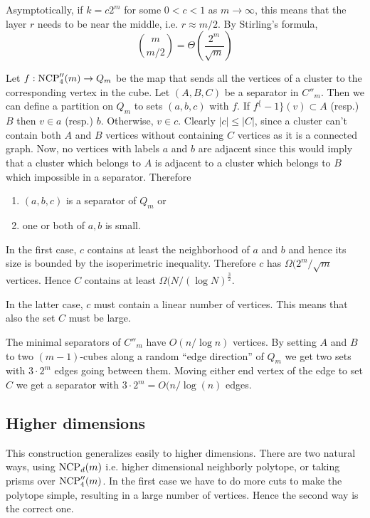 Asymptotically, if $k = c2^m$ for some $0<c<1$ as $m\rightarrow \infty$, this 
means that the layer $r$ needs to be near the middle, i.e. $r\approx m/2$. 
By Stirling's formula,
\begin{equation}
 {m \choose m/2} = \Theta \left(\frac{2^m}{\sqrt{m}}\right)
\end{equation}

Let $f: \textrm{NCP}''_4(m) \rightarrow Q_m$ 
be the map that sends all the vertices of a cluster to the corresponding vertex 
in the cube. 
Let $(A,B,C)$ be a separator in $C''_m$. Then we can define a partition on 
$Q_m$ to sets $(a,b,c)$ with $f$. If $f^\{-1\}(v) \subset A$ (resp.) $B$ then 
$v \in a$ (resp.) $b$. Otherwise, $v \in c$. Clearly $|c| \leq |C|$, since a 
cluster can't contain both $A$ and $B$ vertices without containing $C$ vertices 
as it is a connected graph.
Now, no vertices with labels $a$ and $b$ are adjacent since this would imply 
that a cluster which belongs to $A$ is adjacent to a cluster which belongs to 
$B$ which impossible in a separator. Therefore
\begin{enumerate}
 \item $(a,b,c)$ is a separator of $Q_m$ or
\item one or both of $a,b$ is small.
\end{enumerate}
In the first case, $c$ contains at least the neighborhood of $a$ and $b$ and 
hence its size is bounded by the isoperimetric inequality. Therefore $c$ has 
$\Omega(2^m/\sqrt{m}$ vertices. Hence $C$ contains at least $\Omega(N/(\log 
N)^{\frac{3}{2}}$.

In the latter case, $c$ must contain a linear number of vertices. This means 
that also the set $C$ must be large.  

The minimal separators of $C''_m$ have $O(n/\log n)$ vertices. By setting $A$ 
and $B$ to two $(m-1)$-cubes along a random ``edge direction'' of $Q_m$ we get 
two sets with $3\cdot 2^m$ edges going between them. Moving either end vertex 
of the edge to set $C$ we get a separator with $3\cdot 2^m = O(n/\log(n)$ 
edges.

\subsection{Higher dimensions}

This construction generalizes easily to higher dimensions. There are two 
natural ways, using $\textrm{NCP}_d(m)$ i.e. higher dimensional neighborly polytope, or 
taking prisms over $\textrm{NCP}''_4(m)$.  In the first case we have to do more cuts to 
make the polytope simple, resulting in a large number of vertices. Hence the 
second way is the correct one. 

